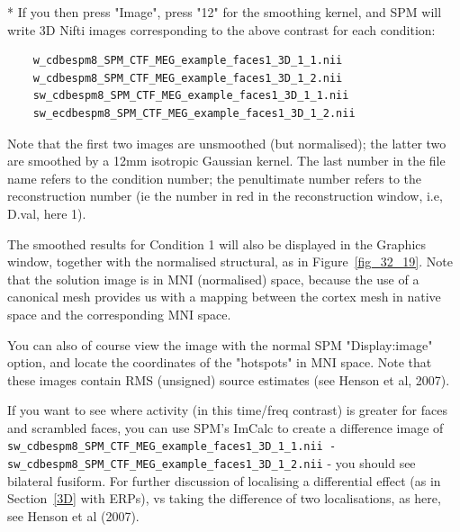 * If you then press "Image", press "12" for the smoothing kernel, and SPM will write 3D Nifti images corresponding to the above contrast for each condition:
\begin{verbatim}
    w_cdbespm8_SPM_CTF_MEG_example_faces1_3D_1_1.nii
    w_cdbespm8_SPM_CTF_MEG_example_faces1_3D_1_2.nii
    sw_cdbespm8_SPM_CTF_MEG_example_faces1_3D_1_1.nii
    sw_ecdbespm8_SPM_CTF_MEG_example_faces1_3D_1_2.nii
\end{verbatim}
Note that the first two images are unsmoothed (but normalised); the latter two are smoothed by a 12mm isotropic Gaussian kernel. The last number in the file name refers to the condition number; the penultimate number refers to the reconstruction number (ie the number in red in the reconstruction window, i.e, D.val, here 1).

The smoothed results for Condition 1 will also be displayed in the Graphics window, together with the normalised structural, as in Figure~\ref{fig_32_19}. Note that the solution image is in MNI (normalised) space, because the use of a canonical mesh provides us with a mapping between the cortex mesh in native space and the corresponding MNI space.

You can also of course view the image with the normal SPM "Display:image" option, and locate the coordinates of the "hotspots" in MNI space. Note that these images contain RMS (unsigned) source estimates (see Henson et al, 2007).

If you want to see where activity (in this time/freq contrast) is greater for faces and scrambled faces, you can use SPM's ImCalc to create a difference image of \verb!sw_cdbespm8_SPM_CTF_MEG_example_faces1_3D_1_1.nii - sw_cdbespm8_SPM_CTF_MEG_example_faces1_3D_1_2.nii! - you should see bilateral fusiform. For further discussion of localising a differential effect (as in Section~\ref{3D} with ERPs), vs taking the difference of two localisations, as here, see Henson et al (2007).

    

